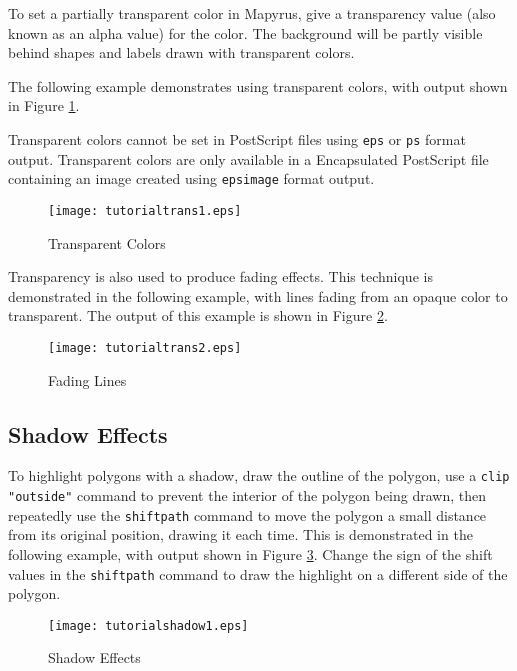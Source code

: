 To set a partially transparent color in Mapyrus, give a
transparency value (also known as an alpha value) for the color.
The background will be partly visible behind shapes and labels
drawn with transparent colors.

The following example demonstrates using transparent colors, with
output shown in Figure \ref{tutorialtrans1}.

Transparent colors cannot be set in PostScript files using
\texttt{eps} or \texttt{ps}
format output.
Transparent colors are only available in a Encapsulated PostScript file
containing an image created using
\texttt{epsimage}
format output.



\begin{figure}[htb]
\texttt{[image: tutorialtrans1.eps]}
\caption{Transparent Colors}
\label{tutorialtrans1}
\end{figure}

Transparency is also used to produce fading effects.
This technique is demonstrated in the following example, with
lines fading from an opaque color to transparent.
The output of this example is shown in Figure \ref{tutorialtrans2}.



\begin{figure}[htb]
\texttt{[image: tutorialtrans2.eps]}
\caption{Fading Lines}
\label{tutorialtrans2}
\end{figure}

\subsection{Shadow Effects}
\label{tutorialshadow}

To highlight polygons with a shadow, draw the outline of the polygon, use a
\texttt{clip "outside"}
command to prevent the interior of the polygon being drawn,
then repeatedly use the \texttt{shiftpath} command to move the polygon a small
distance from its original position, drawing it each time.  This is
demonstrated in the following example, with output shown in Figure
\ref{tutorialshadow1}.  Change the sign of the shift values in the
\texttt{shiftpath} command to draw the highlight on a different side of the
polygon.



\begin{figure}[htb]
\texttt{[image: tutorialshadow1.eps]}
\caption{Shadow Effects}
\label{tutorialshadow1}
\end{figure}

